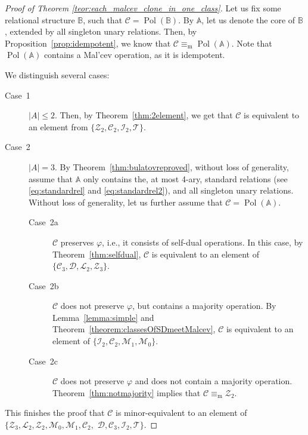 \documentclass[12pt]{amsart}
\theoremstyle{definition}
\theoremstyle{definition}
\newcommand{\clo}[1]{\mathcal{#1}}
\DeclareMathOperator{\Pol}{Pol}
\newcommand{\minorequivalentto}{\equiv_{\mathrm{m}}}
\begin{document}
\begin{proof}[Proof of Theorem \ref{teor:each_malcev_clone_in_one_class}]
Let us fix some relational structure $\mathbb B$, such that $\mathcal C = \Pol(\mathbb B)$. By $\mathbb A$, let us denote the core of $\mathbb B$, extended by all singleton unary relations. Then, by Proposition~\ref{prop:idempotent}, we know that $\mathcal C \minorequivalentto \Pol(\mathbb A)$. Note that $\Pol(\mathbb A)$ contains a Mal'cev operation, as it is idempotent.

We distinguish several cases: 

\begin{description}
\item[Case~1] $|A| \leq 2$. Then, by Theorem~\ref{thm:2element}, we get that $\clo{C}$ is equivalent to an element from $\{\clo{Z}_2,\clo{C}_2,\clo{I}_2,\clo{T}\}$.
\item[Case~2] $|A| = 3$. By Theorem~\ref{thm:bulatovreproved}, without loss of generality, assume that $\mathbb A$ only contains the, at most 4-ary, standard relations (see \eqref{eq:standardrel} and \eqref{eq:standardrel2}), and all singleton unary relations. Without loss of generality, let us further assume that $\mathcal C = \Pol(\mathbb A)$.
\begin{description}
\item[Case~2a] $\mathcal C$ preserves $\varphi$, i.e., it consists of self-dual operations. In this case, by Theorem~\ref{thm:selfdual}, $\clo{C}$ is equivalent to an element of $\{\clo{C}_3, \clo{D}, \clo{L}_2, \clo{Z}_3\}$. 

\item[Case~2b] $\mathcal C$ does not preserve $\varphi$, but contains a majority operation. By Lemma~\ref{lemma:simple} and  Theorem~\ref{theorem:classesOfSDmeetMalcev}, $\clo{C}$ is equivalent to an element of $\{\clo{I}_2,\clo{C}_2,\clo{M}_1,\clo{M}_0\}$.

\item[Case~2c] $\mathcal C$ does not preserve $\varphi$ and does not contain a majority operation. Theorem~\ref{thm:notmajority} implies that $\clo{C} \minorequivalentto \clo{Z}_2$.
\end{description}
\end{description}

This finishes the proof that $\clo{C}$ is minor-equivalent to an element of $\{\clo{Z}_3, \clo{L}_2, \clo{Z}_2, \clo{M}_0,\clo{M}_1, \clo{C}_2,$ $ \clo{D},\clo{C}_3, \clo{I}_2,\clo{T}\}$.


\end{proof}
\end{document}
